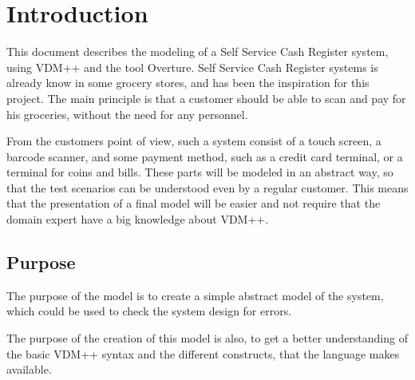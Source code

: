 \chapter{Introduction}
This document describes the modeling of a Self Service Cash Register system, using VDM++ and the tool Overture.
Self Service Cash Register systems is already know in some grocery stores, and has been the inspiration for this project.
The main principle is that a customer should be able to scan and pay for his groceries, without the need for any personnel.


From the customers point of view, such a system consist of a touch screen, a barcode scanner, and some payment method, such as a credit card terminal, or a terminal for coins and bills. These parts will be modeled in an abstract way, so that the test scenarios can be understood even by a regular customer. This means that the presentation of a final model will be easier and not require that the domain expert have a big knowledge about VDM++.

\section{Purpose}
The purpose of the model is to create a simple abstract model of the system, which could be used to check the system design for errors.

The purpose of the creation of this model is also, to get a better understanding of the basic VDM++ syntax and the different constructs, that the language makes available.